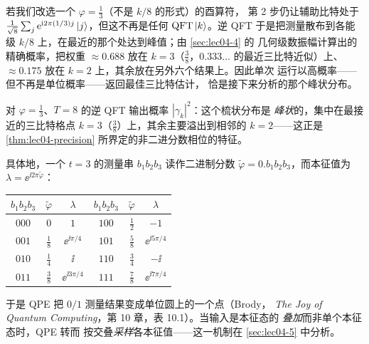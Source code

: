 \begin{remark}[当本征相位非二进分数时]
\label{rem:lec04-nondyadic}
若我们改选一个 $\varphi=\tfrac13$（不是 $k/8$ 的形式）的酉算符，
第 2 步仍让辅助比特处于
$\tfrac{1}{\sqrt8}\sum_j\mathrm{e}^{\mathrm{i} 2\pi(1/3)j}\ket{j}$，但这不再是任何
$\mathrm{QFT}\ket{k}$。逆 QFT 于是把测量散布到各能级
$k/8$ 上，在最近的那个处达到峰值；由 \cref{sec:lec04-4} 的
几何级数振幅计算出的精确概率，把权重 $\approx0.688$ 放在
$k=3$（$\tfrac38$，$0.333\ldots$ 的最近三比特近似）上、
$\approx0.175$ 放在 $k=2$ 上，其余放在另外六个结果上。因此单次
运行以高概率——但不再是单位概率——返回最佳三比特估计，
恰是接下来分析的那个峰状分布。

\begin{center}
\end{center}
\noindent\small 对 $\varphi=\tfrac13$、$T=8$ 的逆 QFT 输出概率 $|\gamma_k|^2$：这个梳状分布是
\emph{峰状}的，集中在最接近的三比特格点 $k=3$（$\tfrac38$）上，其余主要溢出到相邻的
$k=2$——这正是 \cref{thm:lec04-precision} 所界定的非二进分数相位的特征。
\end{remark}

\begin{remark}
\label{rem:lec04-dictionary}
具体地，一个 $t=3$ 的测量串 $b_1b_2b_3$ 读作二进制分数
$\tilde\varphi=0.b_1b_2b_3$，而本征值为 $\lambda=\ee^{\ii 2\pi\tilde\varphi}$：
\begin{center}
\begin{tabular}{ccc@{\qquad}ccc}
\toprule
$b_1b_2b_3$ & $\tilde\varphi$ & $\lambda$ & $b_1b_2b_3$ & $\tilde\varphi$ & $\lambda$\\ \midrule
$000$ & $0$            & $1$                 & $100$ & $\tfrac12$ & $-1$\\
$001$ & $\tfrac18$     & $\ee^{\ii\pi/4}$    & $101$ & $\tfrac58$ & $\ee^{\ii 5\pi/4}$\\
$010$ & $\tfrac14$     & $\ii$               & $110$ & $\tfrac34$ & $-\ii$\\
$011$ & $\tfrac38$     & $\ee^{\ii 3\pi/4}$  & $111$ & $\tfrac78$ & $\ee^{\ii 7\pi/4}$\\ \bottomrule
\end{tabular}
\end{center}
于是 QPE 把 $0/1$ 测量结果变成单位圆上的一个点（Brody，
\emph{The Joy of Quantum Computing}，第 10 章，表 10.1）。当输入是本征态的
\emph{叠加}而非单个本征态时，QPE 转而
按交叠\emph{采样}各本征值——这一机制在
\cref{sec:lec04-5} 中分析。
\end{remark}
